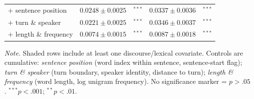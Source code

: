 \begin{table}[t]
\begin{threeparttable}
\begin{tabular}{@{} l r@{}l r@{}l @{}}
      \rowcolor{discourseGray}
      \quad $+$ sentence position
        & $0.0248 \pm 0.0025$ & $^{***}$
        & $0.0337 \pm 0.0036$ & $^{***}$ \\
      \rowcolor{discourseGray}
      \quad $+$ turn \& speaker
        & $0.0221 \pm 0.0025$ & $^{***}$
        & $0.0346 \pm 0.0037$ & $^{***}$ \\
      \rowcolor{discourseGray}
      \quad $+$ length \& frequency
        & $0.0074 \pm 0.0015$ & $^{***}$
        & $0.0087 \pm 0.0018$ & $^{***}$ \\
      \bottomrule
    \end{tabular}
    \begin{tablenotes}[flushleft]
      \footnotesize
      \item \textit{Note.}
        Shaded rows include at least one discourse/lexical covariate.
        Controls are cumulative:
        \textit{sentence position} (word index within sentence, sentence-start flag);
        \textit{turn \& speaker} (turn boundary, speaker identity, distance to turn);
        \textit{length \& frequency} (word length, log unigram frequency).
        No significance marker = $p > .05$.
        $^{***}p < .001$;\; $^{**}p < .01$.
    \end{tablenotes}
  \end{threeparttable}
\end{table}
